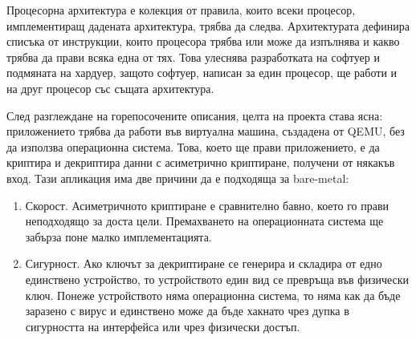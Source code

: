 Процесорна архитектура е колекция от правила, които всеки процесор, имплементиращ дадената архитектура, трябва да следва. Архитектурата дефинира списъка от инструкции, които процесора трябва или може да изпълнява и какво трябва да прави всяка една от тях. Това улеснява разработката на софтуер и подмяната на хардуер, защото софтуер, написан за един процесор, ще работи и на друг процесор със същата архитектура.

След разглеждане на горепосочените описания, целта на проекта става ясна: приложението трябва да работи във виртуална машина, създадена от QEMU, без да използва операционна система. Това, което ще прави приложението, е да криптира и декриптира данни с асиметрично криптиране, получени от някакъв вход. Тази апликация има две причини да е подходяща за bare-metal:
\begin{enumerate}
  \item Скорост. Асиметричното криптиране е сравнително бавно, което го прави неподходящо за доста цели. Премахването на операционната система ще забърза поне малко имплементацията.
  \item Сигурност. Ако ключът за декриптиране се генерира и складира от едно единствено устройство, то устройството един вид се превръща във физически ключ. Понеже устройството няма операционна система, то няма как да бъде заразено с вирус и единствено може да бъде хакнато чрез дупка в сигурността на интерфейса или чрез физически достъп.
\end{enumerate}


